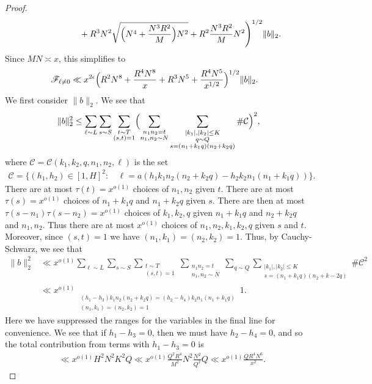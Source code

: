 \documentclass[10pt]{amsart}
\theoremstyle{plain}
\numberwithin{equation}{section}
\begin{document}
\begin{proof}
\begin{align*}
&\qquad\qquad\qquad+R^3N^2\sqrt{\Bigl(N^4+\frac{N^3 R^2}{M}\Bigr)N^2}+R^2\frac{N^3 R^2}{M}N^2\Biggr)^{1/2}\|b\|_2.
\end{align*}
Since $MN\asymp x$, this simplifies to
\begin{align}
\mathscr{F}_{\ell\ne0}&\ll x^{2\epsilon} \Bigl(R^2 N^8+\frac{R^4 N^8}{x}+R^3N^5+\frac{R^4 N^5}{x^{1/2}}\Bigr)^{1/2}\|b\|_2.\label{eq:FouvryFOffDiag}
\end{align}
We first consider $\|b\|_2$. We see that
\[
\|b\|_2^2\le \sum_{\ell\sim L}\sum_{s\sim S}\sum_{\substack{t\sim T\\ (s,t)=1}}\Bigl(\sum_{\substack{n_1n_2=t\\ n_1,n_2\sim N}}\sum_{\substack{|k_1|,|k_2|\le K\\ q\sim Q \\ s=(n_1+k_1q)(n_2+k_2q)}}\#\mathcal{C}\Bigr)^2,
\]
where $\mathcal{C}=\mathcal{C}(k_1,k_2,q,n_1,n_2,\ell)$ is the set
\begin{align*}
\mathcal{C}=\{(h_1,h_2)\in [1,H]^2:&\,\ell=a(h_1k_1n_2(n_2+k_2q)-h_2k_2n_1(n_1+k_1q))\}.
\end{align*}
There are at most $\tau(t)=x^{o(1)}$ choices of $n_1,n_2$ given $t$. There are at most $\tau(s)=x^{o(1)}$ choices of $n_1+k_1q$ and $n_1+k_2q$ given $s$. There are then at most $\tau(s-n_1)\tau(s-n_2)=x^{o(1)}$ choices of $k_1,k_2,q$ given $n_1+k_1q$ and $n_2+k_2q$ and $n_1,n_2$. Thus there are at most $x^{o(1)}$ choices of $n_1,n_2,k_1,k_2,q$ given $s$ and $t$. Moreover, since $(s,t)=1$ we have $(n_1,k_1)=(n_2,k_2)=1$. Thus, by Cauchy-Schwarz, we see that
\begin{align*}
\|b\|_2^2&\ll x^{o(1)}\sum_{\ell\sim L}\sum_{s\sim S}\sum_{\substack{t\sim T\\ (s,t)=1}}\sum_{\substack{n_1n_2=t\\ n_1,n_2\sim  N}}\sum_{q\sim Q}\sum_{\substack{|k_1|,|k_2|\le K\\ s=(n_1+k_1q)(n_2+k-2q)}}\#\mathcal{C}^2\\
&\ll x^{o(1)} \mathop{\sum_{n_1,n_2,k_1,k_2,q}\,\,\sum_{h_1,h_2,h_3,h_4}}\limits_{\substack{(h_1-h_3)k_1n_2(n_2+k_2q)=(h_2-h_4)k_2n_1(n_1+k_1q)\\ (n_1,k_1)=(n_2,k_2)=1}}1.
\end{align*}
Here we have suppressed the ranges for the variables in the final line for convenience. We see that if $h_1-h_3=0$, then we must have $h_2-h_4=0$, and so the total contribution from terms with $h_1-h_3=0$ is
\begin{align}
&\ll x^{o(1)} H^2 N^2 K^2Q\ll x^{o(1)} \frac{Q^2 R^4}{M^2}N^2\frac{N^2}{Q^2}Q\ll x^{o(1)} \frac{Q R^4N^6}{x^2}.

\end{align}
\end{proof}
\end{document}
